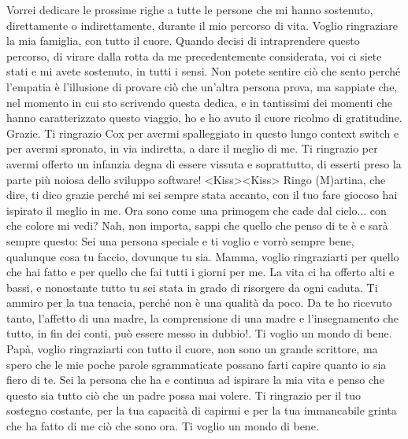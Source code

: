 \vspace{.05\textheight}

\noindent Vorrei dedicare le prossime righe a tutte le persone che mi hanno sostenuto, direttamente o indirettamente, durante il mio percorso di vita.
\newline\newline
Voglio ringraziare la mia famiglia, con tutto il cuore. Quando decisi di intraprendere questo percorso, di virare dalla rotta da me precedentemente considerata, voi ci siete stati e mi avete sostenuto, in tutti i sensi. Non potete sentire ciò che sento perché l'empatia è l'illusione di provare ciò che un'altra persona prova, ma sappiate che, nel momento in cui sto scrivendo questa dedica, e in tantissimi dei momenti che hanno caratterizzato questo viaggio, ho e ho avuto il cuore ricolmo di gratitudine. Grazie.
\newline\newline
Ti ringrazio Cox per avermi spalleggiato in questo lungo context switch e per avermi spronato, in via indiretta, a dare il meglio di me. Ti ringrazio per avermi offerto un infanzia degna di essere vissuta e soprattutto, di esserti preso la parte più noiosa dello sviluppo software! <Kiss><Kiss> Ringo
\newline\newline
(M)artina, che dire, ti dico grazie perché mi sei sempre stata accanto, con il tuo fare giocoso hai ispirato il meglio in me. Ora sono come una primogem che cade dal cielo... con che colore mi vedi? Nah, non importa, sappi che quello che penso di te è e sarà sempre questo: Sei una persona speciale e ti voglio e vorrò sempre bene, qualunque cosa tu faccio, dovunque tu sia.
\newline\newline
Mamma, voglio ringraziarti per quello che hai fatto e per quello che fai tutti i giorni per me. La vita ci ha offerto alti e bassi, e nonostante tutto tu sei stata in grado di risorgere da ogni caduta. Ti ammiro per la tua tenacia, perché non è una qualità da poco. Da te ho ricevuto tanto, l'affetto di una madre, la comprensione di una madre e l'insegnamento che tutto, in fin dei conti, può essere messo in dubbio!. Ti voglio un mondo di bene.
\newline\newline
Papà, voglio ringraziarti con tutto il cuore, non sono un grande scrittore, ma spero che le mie poche parole sgrammaticate possano farti capire quanto io sia fiero di te. Sei la persona che ha e continua ad ispirare la mia vita e penso che questo sia tutto ciò che un padre possa mai volere. Ti ringrazio per il tuo sostegno costante, per la tua capacità di capirmi e per la tua immancabile grinta che ha fatto di me ciò che sono ora. Ti voglio un mondo di bene.
